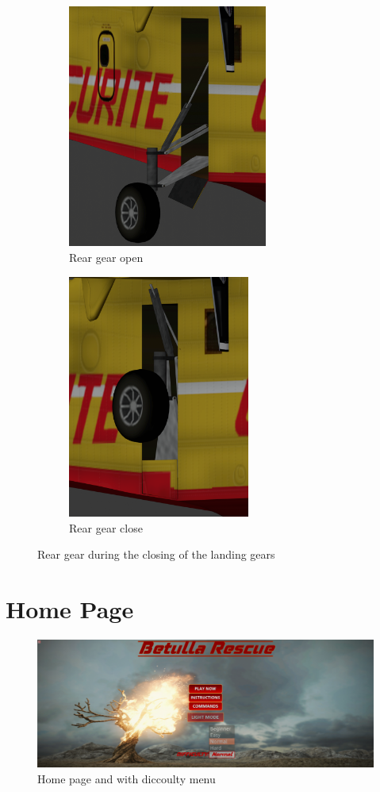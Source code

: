 \documentclass{article}
\begin{document}
\begin{figure}[h!]
  \centering
  \begin{subfigure}[h!]{0.4\linewidth}
    \includegraphics[height=80mm]{ImmaginiReport/postopen.png}
    \caption{Rear gear open}
  \end{subfigure}
  \begin{subfigure}[h!]{0.4\linewidth}
    \includegraphics[height=80mm]{ImmaginiReport/postclose.png}
    \caption{Rear gear close}
  \end{subfigure}
  \caption{Rear gear during the closing of the landing gears}
\end{figure}

\newpage

\section*{Home Page}

\begin{figure}[h!]
  \includegraphics[width=\linewidth]{ImmaginiReport/initial.png}
  \caption{Home page and with diccoulty menu}
\end{figure}
\end{document}
